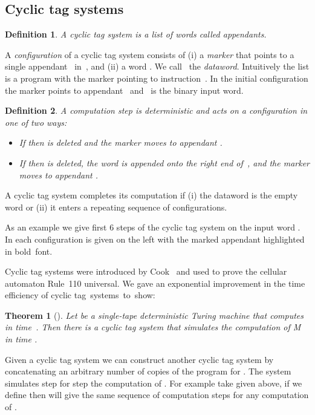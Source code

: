 \documentclass[11pt]{article} \usepackage{amsfonts,amsmath,amssymb,amsthm}
\newtheorem{theorem}{Theorem}
\newtheorem{definition}{Definition}
\begin{document}
\subsection{Cyclic tag systems}\label{sec:Cyclic tag systems}
\begin{definition}\label{def:Cyclic tag system}
A cyclic tag system  is a list 
of words  called appendants.
\end{definition}
A {\em configuration} of a cyclic tag system consists of (i) a {\em marker} that points to a single appendant~ in~, and (ii) a word . We call~ the {\em dataword}. Intuitively the list  is a program with the marker pointing to instruction~. In the initial configuration the marker points to appendant~ and~ is the binary input word.
\begin{definition}\label{def:Computation CTS}
A computation step is deterministic and acts on a configuration in one of 
two ways:
\begin{itemize}
\item If  then  is deleted and the marker moves to appendant 
.
\item If  then  is deleted, the word  is 
appended onto the right end of~,  and the marker moves to appendant 
.
\end{itemize}
\end{definition}
A cyclic tag system completes its computation if (i) the dataword is the empty word or (ii) it enters a repeating sequence of configurations.

As an example we give first 6 steps of the cyclic tag system  on the input word . In each configuration  is given on the left with the marked  appendant highlighted in bold~font.

Cyclic tag systems were introduced by Cook~\cite{Cook2004} and used to prove the cellular automaton Rule~110 universal. We gave an exponential improvement in the time efficiency of cyclic tag~systems~to~show:
\begin{theorem}[\cite{NearyWoods2006C}]\label{thm:CTS simulate TMs}
Let  be a single-tape deterministic Turing machine that computes in time~. Then there is a cyclic tag system  that simulates the computation of M in time . 
\end{theorem}
Given a cyclic tag system  we can construct another cyclic tag system  by concatenating an arbitrary number of copies of the program for . The system  simulates step for step the computation of . For example take  given above, if we define  then  will give the same sequence of computation steps for any computation of .
\end{document}

